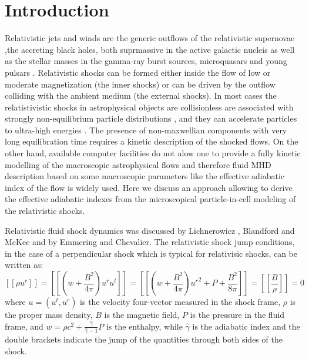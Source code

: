 \documentclass[a4paper]{jpconf}
\begin{document}
	\section{Introduction}
	Relativistic jets and winds are the generic outflows of the relativistic supernovae \cite{2010Natur.463..513S,2007ApJ...667..351W},the  accreting black holes, both suprmassive in the active galactic nucleis \cite{1984RvMP...56..255B} as well as the stellar masses in the gamma-ray burst sources, microquasars \cite{2019MmSAI..90...57M,1999PhR...314..575P,2014LNP...876.....R} and young pulsars \cite{2017SSRv..207....1B}. Relativistic shocks can be formed either inside the flow of low or moderate magnetization (the inner shocks) or can be driven by the outflow colliding with the ambient medium (the external shocks). In most cases the relatistivistic shocks in astrophysical objects are collisionless are associated with strongly non-equilibrium particle distributions
	\cite{2012SSRv..173..309B,2015SSRv..191..519S,2017SSRv..207..319P}, and they can accelerate particles to ultra-high energies \cite{2009JCAP...11..009L}. The presence of non-maxwellian components with very long equilibration time requires a kinetic description of the shocked flows. On the other hand, available computer facilities do not alow one to provide a fully kinetic modelling of the macroscopic astrophysical flows and therefore fluid MHD description based on some macroscopic parameters like the effective adiabatic index of the flow is widely used. Here we discuss an approach allowing to derive the effective adiabatic indexes from the microscopical particle-in-cell modeling of the relativistic shocks.   
	
	Relativistic fluid shock dynamics was discussed by Lichnerowicz \cite{1967rhm..book.....L}, Blandford and McKee \cite{Blandford76} and by Emmering and Chevalier\cite{Emmering87}. The relativistic shock jump conditions, in the case of a perpendicular shock which is typical for relativisic shocks, can be written as:
	\begin{equation}\label{hugoniot}
	[\![\rho u^r]\!] = [\![ (w + \frac{B^2}{4 \pi})u^r u^t]\!] = [\![(w + \frac{B^2}{4 \pi}){u^r}^2 + P + \frac{B^2}{8 \pi}]\!] = [\![\frac{B}{\rho}]\!] = 0
	\end{equation}
	where $u = (u^t,u^r)$ is the velocity four-vector measured in the shock frame, $\rho$ is the proper mass density, $B$ is the magnetic field, $P$ is the pressure in the fluid frame, and $w = \rho c^2 + \frac{\hat{\gamma}}{\hat{\gamma} - 1} P$ is the enthalpy, while $\hat{\gamma}$ is the adiabatic index and the double brackets indicate the jump of the quantities through both sides of the shock.
	
\end{document}
